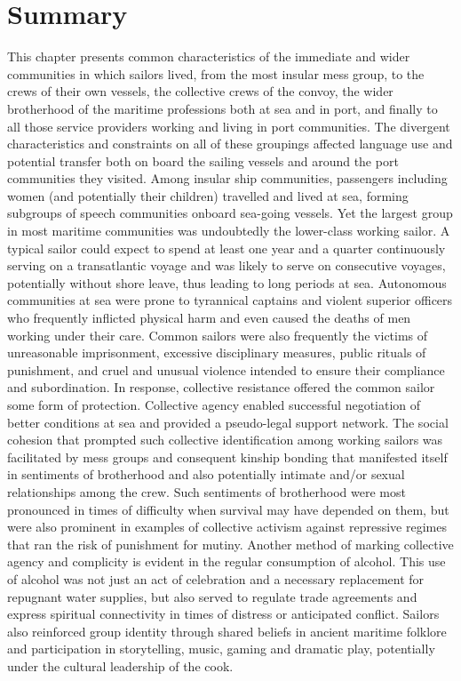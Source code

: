 \section{{Summary}}%

This chapter presents common characteristics of the immediate and wider communities in which sailors lived, from the most insular mess group, to the crews of their own vessels, the collective crews of the convoy, the wider brotherhood of the maritime professions both at sea and in port, and finally to all those service providers working and living in port communities. The divergent characteristics and constraints on all of these groupings affected language use and potential transfer both on board the sailing vessels and around the port communities they visited. Among insular ship communities, passengers including women (and potentially their children) travelled and lived at sea, forming subgroups of speech communities onboard sea-going vessels. Yet the largest group in most maritime communities was undoubtedly the lower-class working sailor. A typical sailor could expect to spend at least one year and a quarter continuously serving on a transatlantic voyage and was likely to serve on consecutive voyages, potentially without shore leave, thus leading to long periods at sea. Autonomous communities at sea were prone to tyrannical captains and violent superior officers who frequently inflicted physical harm and even caused the deaths of men working under their care. Common sailors were also frequently the victims of unreasonable imprisonment, excessive disciplinary measures, public rituals of punishment, and cruel and unusual violence intended to ensure their compliance and subordination. In response, collective resistance offered the common sailor some form of protection. Collective agency enabled successful negotiation of better conditions at sea and provided a pseudo-legal support network. The social cohesion that prompted such collective identification among working sailors was facilitated by mess groups and consequent kinship bonding that manifested itself in sentiments of brotherhood and also potentially intimate and/or sexual relationships among the crew. Such sentiments of brotherhood were most pronounced in times of difficulty when survival may have depended on them, but were also prominent in examples of collective activism against repressive regimes that ran the risk of punishment for mutiny. Another method of marking collective agency and complicity is evident in the regular consumption of alcohol. This use of alcohol was not just an act of celebration and a necessary replacement for repugnant water supplies, but also served to regulate trade agreements and express spiritual connectivity in times of distress or anticipated conflict. Sailors also reinforced group identity through shared beliefs in ancient maritime folklore and participation in storytelling, music, gaming and dramatic play, potentially under the cultural leadership of the cook. 

